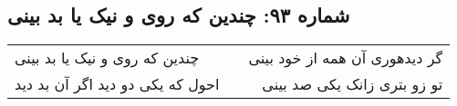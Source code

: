 \begin{center}
\section*{شماره ۹۳: چندین که روی و نیک یا بد بینی}
\label{sec:093}
\begin{longtable}{l p{0.5cm} r}
چندین که روی و نیک یا بد بینی
&&
گر دیدهوری آن همه از خود بینی
\\
احول که یکی دو دید اگر آن بد دید
&&
تو زو بتری زانک یکی صد بینی
\\
\end{longtable}
\end{center}
